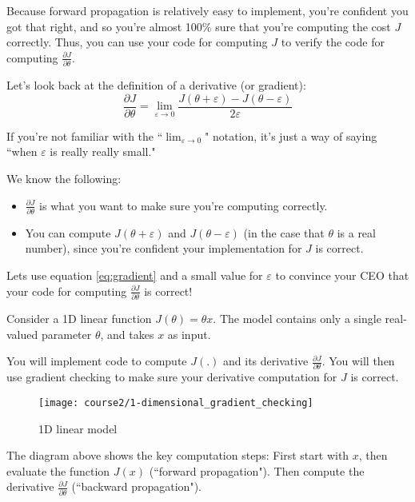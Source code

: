 Because forward propagation is relatively easy to implement, you're confident you got that right, and so you're almost  100\% sure that you're computing the cost $J$ correctly. Thus, you can use your code for computing $J$ to verify the code for computing $\frac{\partial J}{\partial \theta}$. 

Let's look back at the definition of a derivative (or gradient):
\begin{equation}\label{eq:gradient}
\frac{\partial J}{\partial \theta} = \lim_{\varepsilon \to 0} \frac{J(\theta + \varepsilon) - J(\theta - \varepsilon)}{2 \varepsilon} \end{equation}

If you're not familiar with the ``$\displaystyle \lim_{\varepsilon \to 0}$" notation, it's just a way of saying ``when $\varepsilon$ is really really small."

We know the following:
\begin{itemize}
\item  $\frac{\partial J}{\partial \theta}$ is what you want to make sure you're computing correctly. 
\item You can compute $J(\theta + \varepsilon)$ and $J(\theta - \varepsilon)$ (in the case that $\theta$ is a real number), since you're confident your implementation for $J$ is correct. 
\end{itemize}

Lets use equation \eqref{eq:gradient} and a small value for $\varepsilon$ to convince your CEO that your code for computing  $\frac{\partial J}{\partial \theta}$ is correct!


\label{sec:2}

Consider a 1D linear function $J(\theta) = \theta x$. The model contains only a single real-valued parameter $\theta$, and takes $x$ as input.

You will implement code to compute $J(.)$ and its derivative $\frac{\partial J}{\partial \theta}$. You will then use gradient checking to make sure your derivative computation for $J$ is correct. 

\begin{figure}[h]
\begin{center}
\texttt{[image: course2/1-dimensional\_gradient\_checking]}
\caption{1D linear model}
\label{1-dimensional}
\end{center}
\end{figure}

The diagram above shows the key computation steps: First start with $x$, then evaluate the function $J(x)$ (``forward propagation"). Then compute the derivative $\frac{\partial J}{\partial \theta}$ (``backward propagation"). 

